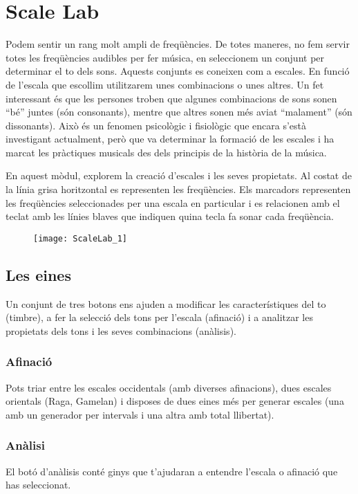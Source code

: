 \section{Scale Lab}
Podem sentir un  rang molt ampli de freqüències. De totes maneres, no fem servir totes les freqüències audibles per fer música, en seleccionem un conjunt per determinar el to dels sons. Aquests conjunts es coneixen com a escales. En funció de l'escala que escollim utilitzarem unes combinacions o unes altres. Un fet interessant és que les persones troben que algunes combinacions de sons sonen  ``bé'' juntes (són consonants), mentre que altres sonen més aviat ``malament'' (són dissonants). Això és un fenomen psicològic i fisiològic que encara s'està investigant actualment, però que va determinar la formació de les escales i ha marcat les pràctiques musicals des dels principis de la història de la música.

En aquest mòdul, explorem la creació d'escales i les seves propietats. Al costat de la línia grisa horitzontal es representen les freqüències. Els marcadors representen les freqüències seleccionades per una escala en particular i es relacionen amb el teclat amb les línies blaves que indiquen quina tecla fa sonar cada freqüència.

\begin{figure}[h]
\centering
\texttt{[image: ScaleLab\_1]}
\end{figure}

\subsection{Les eines}
Un conjunt de tres botons ens ajuden a modificar les característiques del to (timbre), a fer la selecció dels tons per l'escala (afinació) i a analitzar les propietats dels tons i les seves combinacions (anàlisis).


\subsubsection{Afinació}
Pots triar entre les escales occidentals (amb diverses afinacions), dues escales orientals (Raga, Gamelan) i disposes de dues eines més per generar escales (una amb un generador per intervals i una altra amb total llibertat).

\subsubsection{Anàlisi}
El botó d'anàlisis conté ginys que t'ajudaran a entendre l'escala o afinació que has seleccionat.

